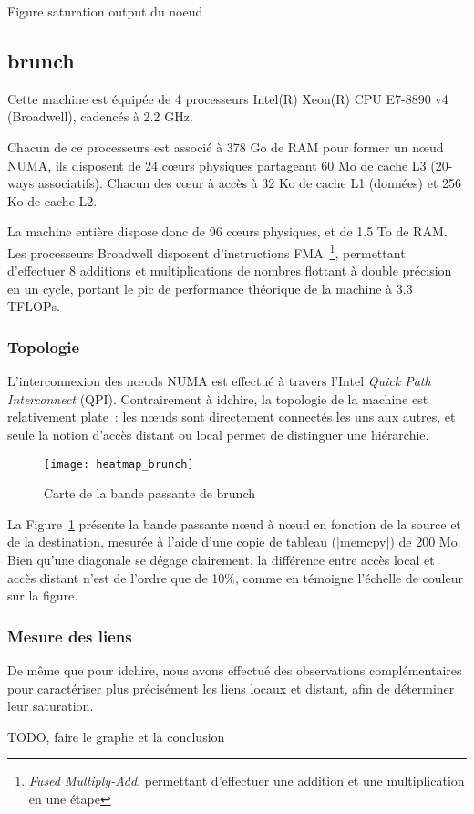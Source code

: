 \begin{todo}
  Figure saturation output du noeud
\end{todo}


\subsection{brunch}\label{sec:contribs:machines:brunch}

Cette machine est équipée de 4 processeurs Intel(R) Xeon(R) CPU E7-8890 v4 (Broadwell), cadencés à 2.2 GHz.

Chacun de ce processeurs est associé à 378 Go de RAM pour former un nœud NUMA, ils disposent de 24 cœurs physiques partageant 60 Mo de cache L3 (20-ways associatifs).
Chacun des cœur à accès à 32 Ko de cache L1 (données) et 256 Ko de cache L2.

La machine entière dispose donc de 96 cœurs physiques, et de 1.5 To de RAM.
Les processeurs Broadwell disposent d'instructions FMA~\footnote{\emph{Fused Multiply-Add}, permettant d'effectuer une addition et une multiplication en une étape}, permettant d'effectuer 8 additions et multiplications de nombres flottant à double précision en un cycle, portant le pic de performance théorique de la machine à 3.3 TFLOPs.


\subsubsection{Topologie}

L'interconnexion des nœuds NUMA est effectué à travers l'Intel \emph{Quick Path Interconnect} (QPI).
Contrairement à idchire, la topologie de la machine est relativement plate~: les nœuds sont directement connectés les uns aux autres, et seule la notion d'accès distant ou local permet de distinguer une hiérarchie.

\begin{figure}[h]
  \centering
  \texttt{[image: heatmap\_brunch]}
  \caption{Carte de la bande passante de brunch}\label{fig:contribs:machines:brunch:heatmap}
\end{figure}

La Figure~\ref{fig:contribs:machines:brunch:heatmap} présente la bande passante nœud à nœud en fonction de la source et de la destination, mesurée à l'aide d'une copie de tableau (|memcpy|) de 200 Mo.
Bien qu'une diagonale se dégage clairement, la différence entre accès local et accès distant n'est de l'ordre que de 10\%, comme en témoigne l'échelle de couleur sur la figure.

\subsubsection{Mesure des liens}

De même que pour idchire, nous avons effectué des observations complémentaires pour caractériser plus précisément les liens locaux et distant, afin de déterminer leur saturation.

\begin{todo}
  TODO, faire le graphe et la conclusion
\end{todo}

